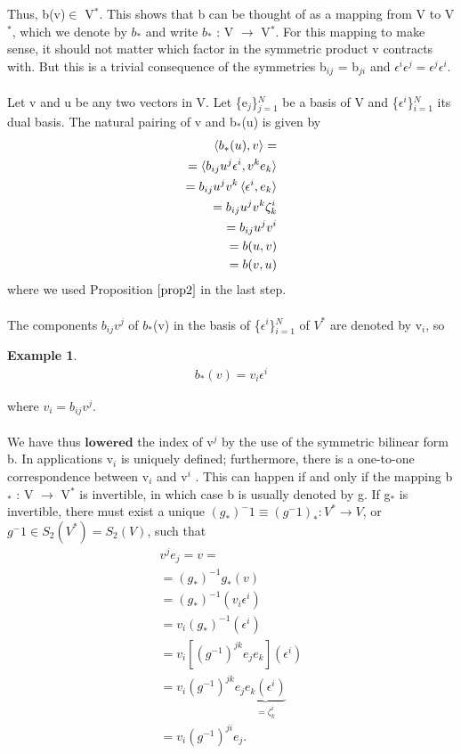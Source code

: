 \documentclass[12pt,a4paper]{article}
\newtheorem{exmp}{Example}[section]
\begin{document}
Thus, b(v)$\in$ V$^*$. This shows that b can be thought of as a mapping from
V to V$^*$, which we denote by $b_*$ and write $b_*$ : V $\to$ V$^*$. For this mapping
to make sense, it should not matter which factor in the symmetric product v
contracts with. But this is a trivial consequence of the symmetries b$_{ij}$ = b$_{ji}$
and $\epsilon^i \epsilon^j = \epsilon^j \epsilon^i.$\\
\\Let v and u be any two vectors in V. Let  \{e$_j$\}$^N_{j=1}$ be a basis of V and \{$\epsilon^i$\}$^N_{i=1}$ its dual basis. The natural pairing of v and b$_*$(u) is given by
\begin{eqnarray*}
\braket{b_*(u), v} = \\
=\braket{b_{ij} u^j \epsilon^i, v^k e_k} \\
= b_{ij}u^j v^k \braket{\epsilon^i, e_k}\\
=b_{ij}u^j v^k \zeta^i_k\\
=b_{ij}u^j v^i\\
=b(u,v)\\
=b(v,u)
\end{eqnarray*}
where we used Proposition $\ref{prop2}$ in the last step.\\
\\
The components $b_{ij}v^{j}$ of $b_*$(v) in the basis of \{$\epsilon^i$\}$^N_{i=1}$ of $V^*$ are denoted by v$_i$, so
\begin{exmp} \label{eq1}
\begin{eqnarray*}
b_*(v) = v_i \epsilon^i
\end{eqnarray*}
\end{exmp}
where $v_i = b_{ij} v^j$.\\
\\
We have thus $\textbf{lowered}$ the index of v$^j$ by the use of the symmetric bilinear
form b. In applications v$_i$ is uniquely defined; furthermore, there is a one-to-one correspondence between v$_i$ and v$^i$
. This can happen if and only if the
mapping b$_*$ : V $\to$ V$^*$ is invertible, in which case b is usually denoted by g.
If g$_*$ is invertible, there must exist a unique $(g_*)^-1 \equiv (g^-1)_* : V^* \to V$, or $g^-1 \in S_2(V^*)= S_2(V)$, such that
\begin{eqnarray*}
v^j e_j = v = \\
=(g_*)^{-1} g_*(v)\\
=(g_*)^{-1} (v_i \epsilon^i)\\
=v_i (g_*)^{-1}(\epsilon^i)\\
=v_i [ (g^{-1})^{jk} e_j e_k ]( \epsilon^i)\\
=v_i (g^{-1}) ^ {jk} e_j \underbrace{e_k (\epsilon^i)}_{= \zeta^i_k}\\
=v_i (g^{-1})^{ji} e_j.
\end{eqnarray*}
\end{document}
